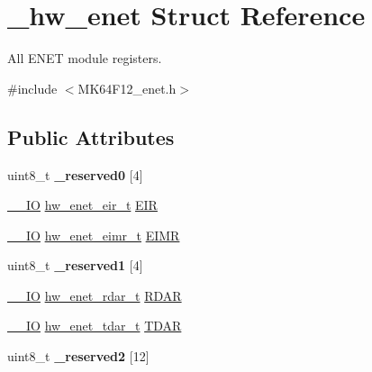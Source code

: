 \hypertarget{struct__hw__enet}{}\section{\+\_\+hw\+\_\+enet Struct Reference}
\label{struct__hw__enet}


All E\+N\+ET module registers.  




{\ttfamily \#include $<$M\+K64\+F12\+\_\+enet.\+h$>$}

\subsection*{Public Attributes}
\begin{DoxyCompactItemize}
\item 
uint8\+\_\+t {\bfseries \+\_\+reserved0} \mbox{[}4\mbox{]}\hypertarget{struct__hw__enet_a680142fcd6ced92271503601806868bd}{}\label{struct__hw__enet_a680142fcd6ced92271503601806868bd}

\item 
\hyperlink{core__sc300_8h_aec43007d9998a0a0e01faede4133d6be}{\+\_\+\+\_\+\+IO} \hyperlink{union__hw__enet__eir}{hw\+\_\+enet\+\_\+eir\+\_\+t} \hyperlink{struct__hw__enet_a4153ebf1a9c3009db2b5cd0683d5825d}{E\+IR}
\item 
\hyperlink{core__sc300_8h_aec43007d9998a0a0e01faede4133d6be}{\+\_\+\+\_\+\+IO} \hyperlink{union__hw__enet__eimr}{hw\+\_\+enet\+\_\+eimr\+\_\+t} \hyperlink{struct__hw__enet_a500db24e26332248656fbca29038daa6}{E\+I\+MR}
\item 
uint8\+\_\+t {\bfseries \+\_\+reserved1} \mbox{[}4\mbox{]}\hypertarget{struct__hw__enet_af25a5414aaf5def5375073293de97197}{}\label{struct__hw__enet_af25a5414aaf5def5375073293de97197}

\item 
\hyperlink{core__sc300_8h_aec43007d9998a0a0e01faede4133d6be}{\+\_\+\+\_\+\+IO} \hyperlink{union__hw__enet__rdar}{hw\+\_\+enet\+\_\+rdar\+\_\+t} \hyperlink{struct__hw__enet_a3e45cbe4fcc3c5d639c3beba27c33e57}{R\+D\+AR}
\item 
\hyperlink{core__sc300_8h_aec43007d9998a0a0e01faede4133d6be}{\+\_\+\+\_\+\+IO} \hyperlink{union__hw__enet__tdar}{hw\+\_\+enet\+\_\+tdar\+\_\+t} \hyperlink{struct__hw__enet_ac7e0660e4bfc88b1e1d9ee99bab78f93}{T\+D\+AR}
\item 
uint8\+\_\+t {\bfseries \+\_\+reserved2} \mbox{[}12\mbox{]}\hypertarget{struct__hw__enet_af146caaac0fa1dcee9c97c0c9fc79d2a}{}\label{struct__hw__enet_af146caaac0fa1dcee9c97c0c9fc79d2a}


\end{DoxyCompactItemize}
